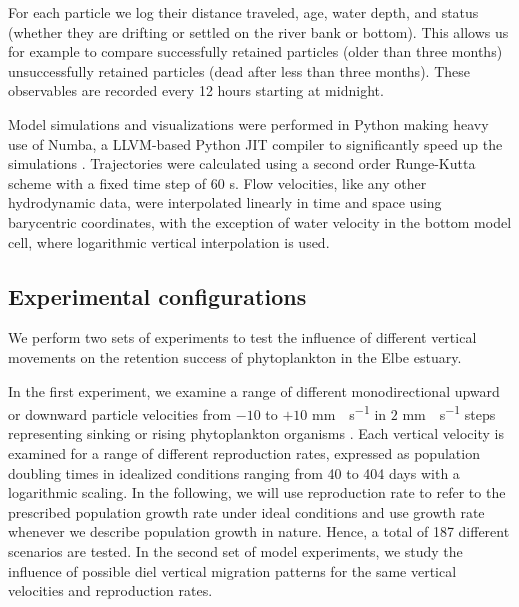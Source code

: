 \documentclass[npg, manuscript]{copernicus}
\begin{document}
For each particle we log their distance traveled, age, water depth, and status (whether they are drifting or settled on the river bank or bottom). This allows us for example to compare successfully retained particles (older than three months) unsuccessfully retained particles (dead after less than three months).
These observables are recorded every 12 hours starting at midnight.

Model simulations and visualizations were performed in Python making heavy use of Numba, a LLVM-based Python JIT compiler \citep{Lam2015} to significantly speed up the simulations \citep{Vennell2021}.
Trajectories were calculated using a second order Runge-Kutta scheme with a fixed time step of 60 \unit{s}.
Flow velocities, like any other hydrodynamic data, were interpolated linearly in time and space using barycentric coordinates, with the exception of water velocity in the bottom model cell, where logarithmic vertical interpolation is used.

\subsection{Experimental configurations}

We perform two sets of experiments to test the influence of different vertical movements on the retention success of phytoplankton in the Elbe estuary.

In the first experiment, we examine a range of different monodirectional upward or downward particle velocities from $-10$ to $+10$ \unit{mm\;s^{-1}} in $2$ \unit{mm\;s^{-1}} steps representing sinking or rising phytoplankton organisms \citep{Fennessy1996}.
Each vertical velocity is examined for a range of different reproduction rates, expressed as population doubling times in idealized conditions ranging from 40 to 404 days with a logarithmic scaling.
In the following, we will use reproduction rate to refer to the prescribed population growth rate under ideal conditions and use growth rate whenever we describe population growth in nature. 
Hence, a total of 187 different scenarios are tested.
In the second set of model experiments, we study the influence of possible diel vertical migration patterns for the same vertical velocities and reproduction rates.
\end{document}
